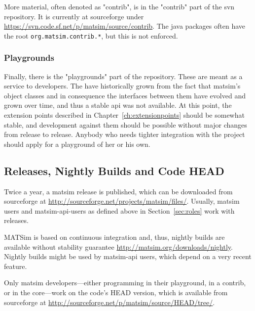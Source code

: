 More material, often denoted as "contrib", is in the "contrib" part of the \gls{svn} repository.  It is currently at \gls{sourceforge} under \url{https://svn.code.sf.net/p/matsim/source/contrib}.  The \gls{java} packages often have the root \lstinline{org.matsim.contrib.*}, but this is not enforced.



\subsubsection{Playgrounds}

Finally, there is the "playgrounds" part of the repository.  These are meant as a service to developers.  The have historically grown from the fact that \gls{matsim}'s object classes and in consequence the interfaces between them have evolved and grown over time, and thus a stable \gls{api} was not available.  At this point, the extension points described in Chapter~\ref{ch:extensionpoints} should be somewhat stable, and development against them should be possible without major changes from release to release.  Anybody who needs tighter integration with the project should apply for a playground of her or his own.  

\subsection{Releases, Nightly Builds and Code HEAD}
\label{sec:releases-builds}

Twice a year, a \gls{matsim} release is published, which can be downloaded from \gls{sourceforge} at \url{http://sourceforge.net/projects/matsim/files/}. Usually, \gls{matsim} users and \gls{matsim}-\gls{api}-users as defined above in Section~\ref{sec:roles} work with releases. 

MATSim is based on continuous integration and, thus, nightly builds are available without stability guarantee \url{http://matsim.org/downloads/nightly}. Nightly builds might be used by \gls{matsim}-\gls{api} users, which depend on a very recent feature. 

Only \gls{matsim} developers---either programming in their playground, in a \gls{contrib}, or in the core---work on the code's HEAD version, which is available from \gls{sourceforge} at \url{http://sourceforge.net/p/matsim/source/HEAD/tree/}.

